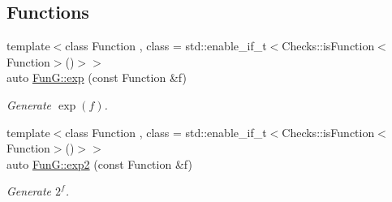 \subsection*{\-Functions}
\begin{DoxyCompactItemize}
\item 
{\footnotesize template$<$class Function , class  = std\-::enable\-\_\-if\-\_\-t$<$\-Checks\-::is\-Function$<$\-Function$>$()$>$$>$ }\\auto \hyperlink{group__CMathGroup_ga00135c8521411f13813f9b972ea4e231}{\-Fun\-G\-::exp} (const \-Function \&f)
\begin{DoxyCompactList}\small\item\em \-Generate $ \exp(f) $. \end{DoxyCompactList}\item 
{\footnotesize template$<$class Function , class  = std\-::enable\-\_\-if\-\_\-t$<$\-Checks\-::is\-Function$<$\-Function$>$()$>$$>$ }\\auto \hyperlink{group__CMathGroup_ga7724faf7db6e9583ac91df322c26ecf5}{\-Fun\-G\-::exp2} (const \-Function \&f)
\begin{DoxyCompactList}\small\item\em \-Generate $2^f$. \end{DoxyCompactList}\end{DoxyCompactItemize}
